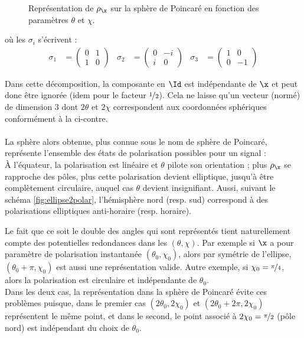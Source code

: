 \begin{figure}
	
	\caption[\DONE Projection sur la sphère de Poincaré]{Représentation de $\rho_{\x}$ sur la sphère de Poincaré en fonction des paramètres $\theta$ et $\chi$.}
	\label{fig:sphere2poincare}
\end{figure}

\par \noindent
où les $\sigma_i$ s'écrivent :
\begin{align*}
	\sigma_1 &= \begin{pmatrix} 0 & 1 \\ 1 &  0 \end{pmatrix}  &
	\sigma_2 &= \begin{pmatrix} 0 & -i \\  i &  0 \end{pmatrix}  &
	\sigma_3 &= \begin{pmatrix} 1 & 0 \\ 0 & -1 \end{pmatrix}
\end{align*}
\skipl

Dans cette décomposition, la composante en $\Id$ est indépendante de $\x$ et peut donc être ignorée (idem pour le facteur $\nicefrac{1}{2}$). Cela ne laisse qu'un vecteur (normé) de dimension 3 dont $2\theta$ et $2\chi$ correspondent aux coordonnées sphériques conformément à la  ci-contre.
\\ 
\\
La sphère alors obtenue, plus connue sous le nom de sphère de Poincaré, représente l'ensemble des états de polarisation possibles pour un signal :
\\
À l'équateur, la polarisation est linéaire et $\theta$ pilote son orientation ; plus $\rho_{\x}$ se rapproche des pôles, plus cette polarisation devient elliptique, jusqu'à être complètement circulaire, auquel cas $\theta$ devient insignifiant. 
Aussi, suivant le schéma \cref{fig:ellipse2polar}, l'hémisphère nord (resp. sud) correspond à des polarisations elliptiques anti-horaire (resp. horaire).

Le fait que ce soit le double des angles qui sont représentés tient naturellement compte des potentielles redondances dans les $(\theta,\chi)$. 
Par exemple si $\x$ a pour paramètre de polarisation instantanée $(\theta_0, \chi_0)$, alors par symétrie de l'ellipse, $(\theta_0+\pi, \chi_0)$ est aussi une représentation valide. Autre exemple, si $\chi_0 = \nicefrac{\pi}{4}$, alors la polarisation est circulaire et indépendante de $\theta_0$.
\\
Dans les deux cas, la représentation dans la sphère de Poincaré évite ces problèmes puisque, dans le premier cas $(2\theta_0, 2\chi_0)$ et $(2\theta_0+2\pi, 2\chi_0)$ représentent le même point, et dans le second, le point associé à $2\chi_0=\nicefrac{\pi}{2}$ (pôle nord) est indépendant du choix de $\theta_0$.

